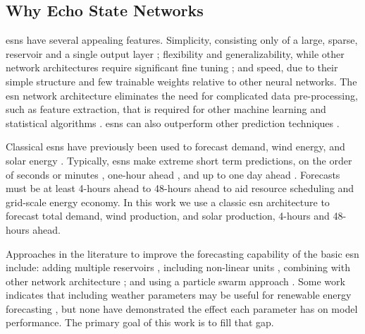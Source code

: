 \subsection{Why Echo State Networks}
\glspl{esn} have several appealing features. Simplicity, consisting only
of a large, sparse, reservoir and a single output layer
\cite{lukosevicius_practical_2012}; flexibility and generalizability,
while other network architectures require significant fine tuning
\cite{liu_deterministic_2019}; and speed, due to their simple structure and
few trainable weights relative to other neural networks. The \gls{esn} network
architecture eliminates the need for complicated data pre-processing, such as
feature extraction, that is required for other machine learning  and statistical
algorithms \cite{lazos_optimisation_2014, chen_day-ahead_2017}.
\glspl{esn} can also outperform other prediction techniques
\cite{jayawardene_comparison_2014,jayawardene_comparison_2015,shi_energy_2016,chitsazan_wind_2019, hu_forecasting_2020}.

Classical \glspl{esn} have previously been used to forecast demand, wind
energy, and solar energy
\cite{deihimi_application_2012,jayawardene_comparison_2015,hu_forecasting_2020}.
Typically, \glspl{esn} make extreme short term predictions, on the
order of seconds or minutes
\cite{chen_novel_2019,wang_echo_2019,chitsazan_wind_2019}, one-hour ahead
\cite{shi_energy_2016}, and up to one day ahead
\cite{deihimi_application_2012}. Forecasts must be at least 4-hours ahead
\cite{wang_quantifying_2016} to 48-hours ahead
\cite{wang_quantifying_2016,mc_garrigle_quantifying_2015,brancucci_martinez-anido_value_2016}
to aid resource scheduling and grid-scale energy economy. In this work we use
a classic \gls{esn} architecture to forecast total demand, wind production, and
solar production, 4-hours and 48-hours ahead.

Approaches in the literature to improve the forecasting capability of
the basic \gls{esn} include: adding multiple reservoirs
\cite{hu_forecasting_2020,gallicchio_deep_2019,yao_novel_2019,li_multi-reservoir_2020}, including non-linear units \cite{holzmann_echo_2008, chitsazan_wind_2019}, combining with other network architecture
\cite{chen_novel_2019, lopez_wind_2018}; and using a particle swarm approach
\cite{chouikhi_pso-based_2017,wang_echo_2019}. Some work indicates that
including weather parameters may be useful for renewable energy forecasting
\cite{li_echo_2019,chitsazan_wind_2019}, but none have demonstrated the effect
each parameter has on model performance. The primary goal of this work
is to fill that gap.

